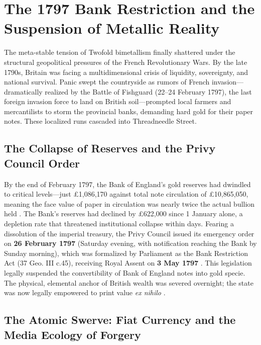 \documentclass[
]{article}
\begin{document}
\newpage

\section{The 1797 Bank Restriction and the Suspension of Metallic
Reality}\label{the-1797-bank-restriction-and-the-suspension-of-metallic-reality}

The meta-stable tension of Twofold bimetallism finally shattered under
the structural geopolitical pressures of the French Revolutionary Wars.
By the late 1790s, Britain was facing a multidimensional crisis of
liquidity, sovereignty, and national survival. Panic swept the
countryside as rumors of French invasion---dramatically realized by the
Battle of Fishguard (22--24 February 1797), the last foreign invasion
force to land on British soil---prompted local farmers and mercantilists
to storm the provincial banks, demanding hard gold for their paper
notes. These localized runs cascaded into Threadneedle Street.

\subsection{The Collapse of Reserves and the Privy Council
Order}\label{the-collapse-of-reserves-and-the-privy-council-order}

By the end of February 1797, the Bank of England's gold reserves had
dwindled to critical levels---just £1,086,170 against total note
circulation of £10,865,050, meaning the face value of paper in
circulation was nearly twice the actual bullion held
\citep{clapham1944bank}. The Bank's reserves had declined by £622,000
since 1 January alone, a depletion rate that threatened institutional
collapse within days. Fearing a dissolution of the imperial treasury,
the Privy Council issued its emergency order on \textbf{26 February
1797} (Saturday evening, with notification reaching the Bank by Sunday
morning), which was formalized by Parliament as the Bank Restriction Act
(37 Geo. III c.45), receiving Royal Assent on \textbf{3 May 1797}
\citep{fetter1965development}. This legislation legally suspended the
convertibility of Bank of England notes into gold specie. The physical,
elemental anchor of British wealth was severed overnight; the state was
now legally empowered to print value \emph{ex nihilo}
\citep{ricardo1810high}.

\subsection{The Atomic Swerve: Fiat Currency and the Media Ecology of
Forgery}\label{the-atomic-swerve-fiat-currency-and-the-media-ecology-of-forgery}
\end{document}
